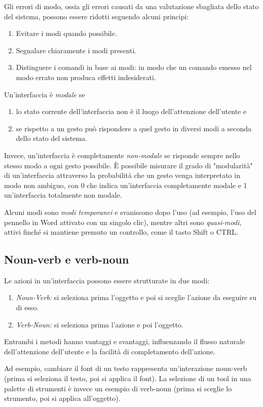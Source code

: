 Gli errori di modo, ossia gli errori causati da una valutazione sbagliata dello stato del sistema, possono essere ridotti seguendo alcuni principi:
\begin{enumerate}
    \item Evitare i modi quando possibile.
    \item Segnalare chiaramente i modi presenti.
    \item Distinguere i comandi in base ai modi: in modo che un comando emesso nel modo errato non produca effetti indesiderati.
\end{enumerate}
Un'interfaccia è \textit{modale} se
\begin{enumerate}
    \item lo stato corrente dell'interfaccia non è il luogo dell'attenzione dell'utente e
    \item se rispetto a un gesto può rispondere a quel gesto in diversi modi a seconda dello stato del sistema.
\end{enumerate}
Invece, un'interfaccia è completamente \textit{non-modale} se risponde sempre nello stesso modo a ogni gesto possibile. È possibile misurare il grado di "modularità" di un'interfaccia attraverso la probabilità che un gesto venga interpretato in modo non ambiguo, con 0 che indica un'interfaccia completamente modale e 1 un'interfaccia totalmente non modale.

Alcuni modi sono \textit{modi temporanei} e svaniscono dopo l’uso (ad esempio, l’uso del pennello in Word attivato con un singolo clic), mentre altri sono \textit{quasi-modi}, attivi finché si mantiene premuto un controllo, come il tasto Shift o CTRL.

\subsection{Noun-verb e verb-noun}
Le azioni in un'interfaccia possono essere strutturate in due modi:
\begin{enumerate}
    \item \textit{Noun-Verb:} si seleziona prima l’oggetto e poi si sceglie l’azione da eseguire su di esso.
    \item \textit{Verb-Noun:} si seleziona prima l’azione e poi l’oggetto.
\end{enumerate}
Entrambi i metodi hanno vantaggi e svantaggi, influenzando il flusso naturale dell'attenzione dell'utente e la facilità di completamento dell’azione.

Ad esempio, cambiare il font di un testo rappresenta un’interazione noun-verb (prima si seleziona il testo, poi si applica il font). La selezione di un tool in una palette di strumenti è invece un esempio di verb-noun (prima si sceglie lo strumento, poi si applica all’oggetto).

